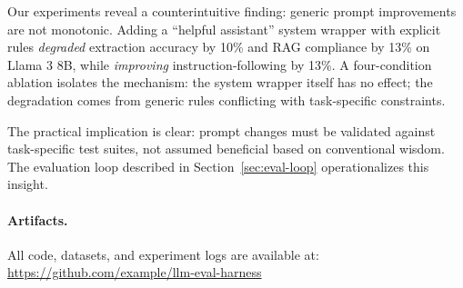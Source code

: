 Our experiments reveal a counterintuitive finding: generic prompt improvements are not monotonic. Adding a ``helpful assistant'' system wrapper with explicit rules \emph{degraded} extraction accuracy by 10\% and RAG compliance by 13\% on Llama 3 8B, while \emph{improving} instruction-following by 13\%. A four-condition ablation isolates the mechanism: the system wrapper itself has no effect; the degradation comes from generic rules conflicting with task-specific constraints.

The practical implication is clear: prompt changes must be validated against task-specific test suites, not assumed beneficial based on conventional wisdom. The evaluation loop described in Section~\ref{sec:eval-loop} operationalizes this insight.

\paragraph{Artifacts.} All code, datasets, and experiment logs are available at: \url{https://github.com/example/llm-eval-harness}
